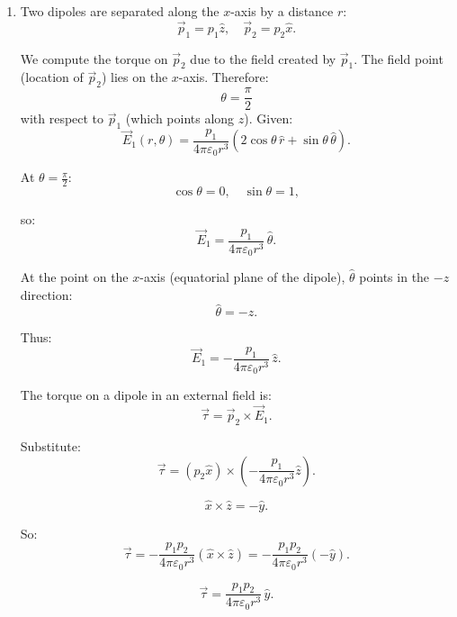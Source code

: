 \documentclass[12pt]{article}
\begin{document}
\begin{enumerate}
Since the dipole is already oriented along $-z$, the field becomes:
\[
\vec{E} = -\frac{p}{4\pi\varepsilon_0 a^3}\,\hat{z}.
\]

Force on the charge:

\[
\vec{F} = q \vec{E}.
\]

\[
\Rightarrow \vec{F} = -\frac{qp}{4\pi\varepsilon_0 a^3}\,\hat{z}.
\]


\item Two dipoles are separated along the $x$-axis by a distance $r$:
\[
\vec{p}_1 = p_1 \hat{z}, \quad \vec{p}_2 = p_2 \hat{x}.
\]

We compute the torque on $\vec{p}_2$ due to the field created by $\vec{p}_1$. The field point (location of $\vec{p}_2$) lies on the $x$-axis. Therefore:
\[
\theta = \frac{\pi}{2}
\]
with respect to $\vec{p}_1$ (which points along $z$). Given:
\[
\vec{E}_1(r,\theta) = \frac{p_1}{4\pi\varepsilon_0 r^3}
\left( 2\cos\theta\,\hat{r} + \sin\theta\,\hat{\theta} \right).
\]

At $\theta = \frac{\pi}{2}$:
\[
\cos\theta = 0, \quad \sin\theta = 1,
\]

so:
\[
\vec{E}_1 = \frac{p_1}{4\pi\varepsilon_0 r^3}\,\hat{\theta}.
\]

At the point on the $x$-axis (equatorial plane of the dipole), $\hat{\theta}$ points in the $-z$ direction:
\[
\hat{\theta} = -\hat{z}.
\]

Thus:
\[
\vec{E}_1 = -\frac{p_1}{4\pi\varepsilon_0 r^3}\,\hat{z}.
\]

The torque on a dipole in an external field is:
\[
\vec{\tau} = \vec{p}_2 \times \vec{E}_1.
\]

Substitute:
\[
\vec{\tau} = (p_2 \hat{x}) \times \left(-\frac{p_1}{4\pi\varepsilon_0 r^3}\hat{z}\right).
\]

\[
\hat{x} \times \hat{z} = -\hat{y}.
\]

So:
\[
\vec{\tau} = -\frac{p_1 p_2}{4\pi\varepsilon_0 r^3} (\hat{x} \times \hat{z})
= -\frac{p_1 p_2}{4\pi\varepsilon_0 r^3} (-\hat{y}).
\]

\[
\vec{\tau} = \frac{p_1 p_2}{4\pi\varepsilon_0 r^3}\,\hat{y}.
\]


\end{enumerate}
\end{document}
